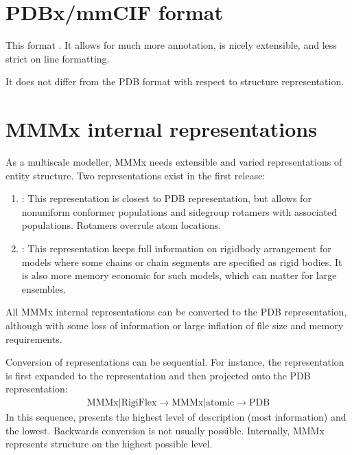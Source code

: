\documentclass[letterpaper,10pt,english]{sphinxmanual}
\begin{document}
\section{PDBx/mmCIF format}
\label{\detokenize{structure_representation:pdbx-mmcif-format}}
This format . It allows for much more annotation, is nicely extensible, and less strict on line formatting.

It does not differ from the PDB format with respect to structure representation.


\section{MMMx internal representations}
\label{\detokenize{structure_representation:mmmx-internal-representations}}
As a multi\sphinxhyphen{}scale modeller, MMMx needs extensible and varied representations of entity structure. Two representations exist in the first release:
\begin{enumerate}
%
\item {} 
{\hyperref[\detokenize{MMMx_atomic:mmmx-atomic}]{}}: This representation is closest to PDB representation, but allows for non\sphinxhyphen{}uniform conformer populations and sidegroup rotamers with associated populations. Rotamers overrule atom locations.

\item {} 
{\hyperref[\detokenize{MMMx_RigiFlex:mmmx-rigiflex}]{}}: This representation keeps full information on rigid\sphinxhyphen{}body arrangement for models where some chains or chain segments are specified as rigid bodies.
It is also more memory economic for such models, which can matter for large ensembles.

\end{enumerate}

All MMMx internal representations can be converted to the PDB representation, although with some loss of information or large inflation of file size and memory requirements.

Conversion of representations can be sequential.
For instance, the  representation is first expanded to the  representation and then projected onto the PDB representation:
\begin{equation*}
\begin{split}\mathrm{MMMx}|\mathrm{RigiFlex} \rightarrow \mathrm{MMMx}|\mathrm{atomic} \rightarrow \mathrm{PDB}\end{split}
\end{equation*}
In this sequence,  presents the highest level of description (most information) and  the lowest. Backwards conversion is not usually possible.
Internally, MMMx represents structure on the highest possible level.
\end{document}
